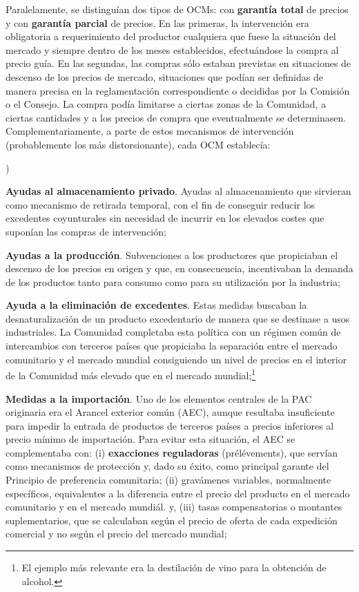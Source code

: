 \documentclass[10pt,a4paper]{article}
\newcounter{alphaitem}
\newenvironment{la}
      {\begin{list}{\alph{alphaitem})}{%
          \usecounter{alphaitem}%
          \setlength{\leftmargin}{1cm}%
          \setlength{\parskip}{3pt}%
          \setlength{\itemsep}{0pt}%
          \setlength{\parsep}{0pt}%
      }}
      {\end{list}}
\begin{document}
Paralelamente, se distinguían dos tipos de OCMs: con \textbf{garantía total} de precios y con \textbf{garantía parcial} de precios. En las primeras, la intervención era obligatoria a requerimiento del productor cualquiera que fuese la situación del mercado y siempre dentro de los meses establecidos, efectuándose la compra al precio guía. En las segundas, las compras sólo estaban previstas en situaciones de descenso de los precios de mercado, situaciones que podían ser definidas de manera precisa en la reglamentación correspondiente o decididas por la Comisión o el Consejo. La compra podía limitarse a ciertas zonas de la Comunidad, a ciertas cantidades y a los precios de compra que eventualmente se determinasen. Complementariamente, a parte de estos mecanismos de intervención (probablemente los más distorsionante), cada OCM establecía:
\begin{la}
    \item \textbf{Ayudas al almacenamiento privado}. Ayudas al almacenamiento que sirvieran como mecanismo de retirada temporal, con el fin de conseguir reducir los excedentes coyunturales sin necesidad de incurrir en los elevados costes que suponían las compras de intervención;
    \item \textbf{Ayudas a la producción}. Subvenciones a los productores que propiciaban el descenso de los precios en origen y que, en consecuencia, incentivaban la demanda de los productos tanto para consumo como para su utilización por la industria;
    \item \textbf{Ayuda a la eliminación de excedentes}. Estas medidas buscaban la desnaturalización de un producto excedentario de manera que se destinase a usos industriales. La Comunidad completaba esta política con un régimen común de intercambios con terceros países que propiciaba la separación entre el mercado comunitario y el mercado mundial consiguiendo un nivel de precios en el interior de la Comunidad más elevado que en el mercado mundial;\footnote{%
        El ejemplo más relevante era la destilación de vino para la obtención de alcohol.
    }
    \item \textbf{Medidas a la importación}. Uno de los elementos centrales de la PAC originaria era el Arancel exterior común (AEC), aunque resultaba insuficiente para impedir la entrada de productos de terceros países a precios inferiores al precio mínimo de importación. Para evitar esta situación, el AEC se complementaba con: (i) \textbf{exacciones reguladoras} (prélévements), que servían como mecanismos de protección y, dado su éxito, como principal garante del Principio de preferencia comunitaria; (ii) gravámenes variables, normalmente específicos, equivalentes a la diferencia entre el precio del producto en el mercado comunitario y en el mercado mundiál. y, (iii) tasas compensatorias o montantes suplementarios, que se calculaban según el precio de oferta de cada expedición comercial y no según el precio del mercado mundial;

\end{la}
\end{document}
